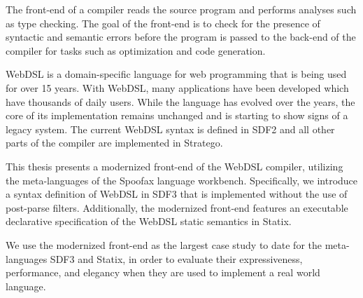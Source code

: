 
The front-end of a compiler reads the source program and performs analyses such as type checking. The goal of the front-end is to check for the presence of syntactic and semantic errors before the program is passed to the back-end of the compiler for tasks such as optimization and code generation.

WebDSL is a domain-specific language for web programming that is being used for over 15 years. With WebDSL, many applications have been developed which have thousands of daily users. While the language has evolved over the years, the core of its implementation remains unchanged and is starting to show signs of a legacy system. The current WebDSL syntax is defined in SDF2 and all other parts of the compiler are implemented in Stratego.

This thesis presents a modernized front-end of the WebDSL compiler, utilizing the meta-languages of the Spoofax language workbench. Specifically, we introduce a syntax definition of WebDSL in SDF3 that is implemented without the use of post-parse filters. Additionally, the modernized front-end features an executable declarative specification of the WebDSL static semantics in Statix.

We use the modernized front-end as the largest case study to date for the meta-languages SDF3 and Statix, in order to evaluate their expressiveness, performance, and elegancy when they are used to implement a real world language.
